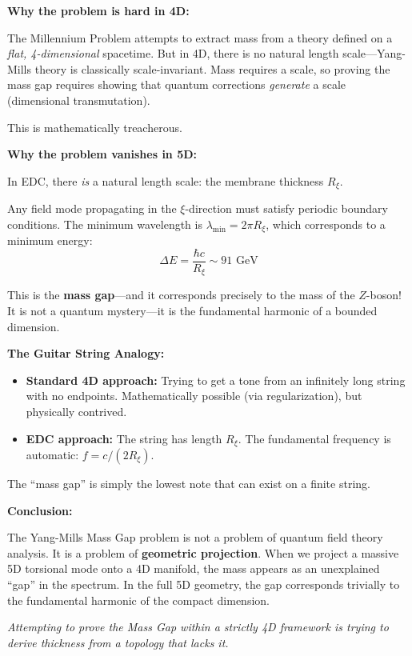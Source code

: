 \begin{tcolorbox}[colback=red!5,colframe=red!60!black,title=\textbf{EDC Perspective: The Mass Gap is a Geometric Necessity}]

\textbf{Why the problem is hard in 4D:}

The Millennium Problem attempts to extract mass from a theory defined on a \textit{flat, 4-dimensional} spacetime. But in 4D, there is no natural length scale---Yang-Mills theory is classically scale-invariant. Mass requires a scale, so proving the mass gap requires showing that quantum corrections \textit{generate} a scale (dimensional transmutation).

This is mathematically treacherous.

\vspace{0.5cm}
\textbf{Why the problem vanishes in 5D:}

In EDC, there \textit{is} a natural length scale: the membrane thickness $R_\xi$.

Any field mode propagating in the $\xi$-direction must satisfy periodic boundary conditions. The minimum wavelength is $\lambda_{\text{min}} = 2\pi R_\xi$, which corresponds to a minimum energy:
\begin{equation}
\Delta E = \frac{\hbar c}{R_\xi} \sim 91 \text{ GeV}
\end{equation}

This is the \textbf{mass gap}---and it corresponds precisely to the mass of the $Z$-boson! It is not a quantum mystery---it is the fundamental harmonic of a bounded dimension.

\vspace{0.5cm}
\textbf{The Guitar String Analogy:}

\begin{itemize}
    \item \textbf{Standard 4D approach:} Trying to get a tone from an infinitely long string with no endpoints. Mathematically possible (via regularization), but physically contrived.
    
    \item \textbf{EDC approach:} The string has length $R_\xi$. The fundamental frequency is automatic: $f = c/(2R_\xi)$.
\end{itemize}

The ``mass gap'' is simply the lowest note that can exist on a finite string.

\vspace{0.5cm}
\textbf{Conclusion:}

The Yang-Mills Mass Gap problem is not a problem of quantum field theory analysis. It is a problem of \textbf{geometric projection}. When we project a massive 5D torsional mode onto a 4D manifold, the mass appears as an unexplained ``gap'' in the spectrum. In the full 5D geometry, the gap corresponds trivially to the fundamental harmonic of the compact dimension.

\textit{Attempting to prove the Mass Gap within a strictly 4D framework is trying to derive thickness from a topology that lacks it.}
\end{tcolorbox}

